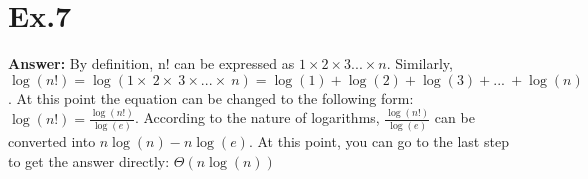\documentclass{article}
\begin{document}
\section*{Ex.7}
    \textbf{Answer:} By definition, n! can be expressed as $1\times 2\times 3...\times n$. Similarly, $\log \left(n!\right)=\log \left(1\times \:2\times \:3\times ...\times \:n\right)=\log \left( 1\right)+\log \left(2\right)+\log \left(3\right)+...\:+\log \left(n\right)$. At this point the equation can be changed to the following form: $\log \left(n!\right)=\frac{\log \left(n!\right)}{\log \left(e\right)}$. According to the nature of logarithms, $\frac{\log \left(n!\right)}{\log \left(e\right)}$ can be converted into $n\log \left(n\right)-n \log \left(e\right)$. At this point, you can go to the last step to get the answer directly: $\Theta\left(n\log \left(n\right)\right)$
\end{document}
